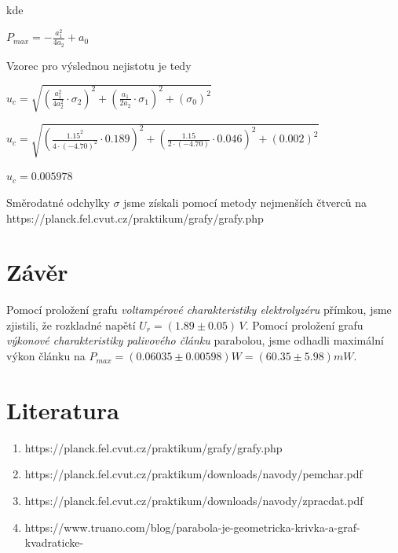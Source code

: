 \documentclass[11pt, a4paper]{report}
\begin{document}
\noindent kde
\begin{center}
	\Large
	$P_{max} = -\frac{a_1^2}{4a_2} + a_0$
\end{center}

Vzorec pro výslednou nejistotu je tedy
\begin{center}
	\Large
	$u_c = \sqrt{(\frac{a_1^2}{4a_2^2} \cdot \sigma_2)^2 + (\frac{a_1}{2a_2} \cdot \sigma_1)^2 + (\sigma_0)^2}$

	\vspace{5pt}
	$u_c = \sqrt{(\frac{1.15^2}{4 \cdot (-4.70)^2} \cdot 0.189)^2 + (\frac{1.15}{2 \cdot (-4.70)} \cdot 0.046)^2 + (0.002)^2}$

	\vspace{5pt}
	$u_c = 0.005978$	
\end{center}
Směrodatné odchylky {\boldmath$\sigma$} jsme získali pomocí metody nejmenších čtverců na https://planck.fel.cvut.cz/praktikum/grafy/grafy.php

\chapter{Závěr}
\large 
Pomocí proložení grafu \emph{voltampérové charakteristiky elektrolyzéru} přímkou, jsme zjistili, že rozkladné napětí $U_r = (1.89 \pm 0.05)\,V$.
\newline
\noindent
Pomocí proložení grafu \emph{výkonové charakteristiky palivového článku} parabolou, jsme odhadli maximální výkon článku na $P_{max} = (0.06035\pm0.00598)W = (60.35\pm5.98)mW$. 

\chapter{Literatura}
\begin{enumerate}
	\item https://planck.fel.cvut.cz/praktikum/grafy/grafy.php
	\item https://planck.fel.cvut.cz/praktikum/downloads/navody/pemchar.pdf
	\item https://planck.fel.cvut.cz/praktikum/downloads/navody/zpracdat.pdf
	\item https://www.truano.com/blog/parabola-je-geometricka-krivka-a-graf-kvadraticke-
\end{enumerate}
\end{document}
